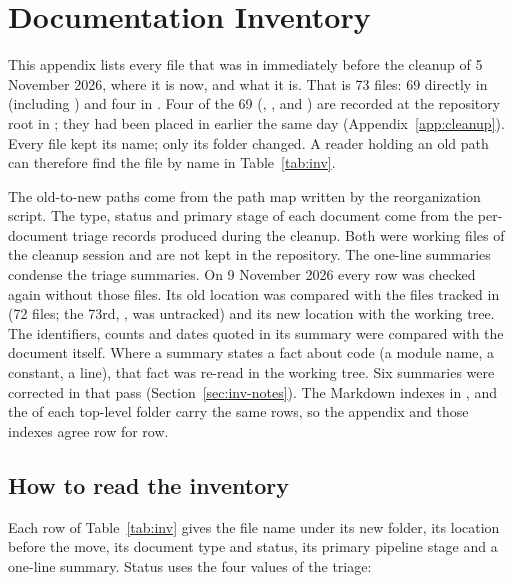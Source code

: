 \chapter{Documentation Inventory}\label{ch:docs-inventory}

This appendix lists every file that was in  immediately before the cleanup of 5 November 2026, where it is now, and what it is. That is 73 files: 69 directly in  (including ) and four in . Four of the 69 (, ,  and ) are recorded at the repository root in ; they had been placed in  earlier the same day (Appendix~\ref{app:cleanup}). Every file kept its name; only its folder changed. A reader holding an old path  can therefore find the file by name in Table~\ref{tab:inv}.

The old-to-new paths come from the path map written by the reorganization script. The type, status and primary stage of each document come from the per-document triage records produced during the cleanup. Both were working files of the cleanup session and are not kept in the repository. The one-line summaries condense the triage summaries. On 9 November 2026 every row was checked again without those files. Its old location was compared with the files tracked in  (72 files; the 73rd, , was untracked) and its new location with the working tree. The identifiers, counts and dates quoted in its summary were compared with the document itself. Where a summary states a fact about code (a module name, a constant, a line), that fact was re-read in the working tree. Six summaries were corrected in that pass (Section~\ref{sec:inv-notes}). The Markdown indexes in ,  and the  of each top-level  folder carry the same rows, so the appendix and those indexes agree row for row.

\section{How to read the inventory}\label{sec:inv-read}

Each row of Table~\ref{tab:inv} gives the file name under its new folder, its location before the move, its document type and status, its primary pipeline stage and a one-line summary. Status uses the four values of the triage:

